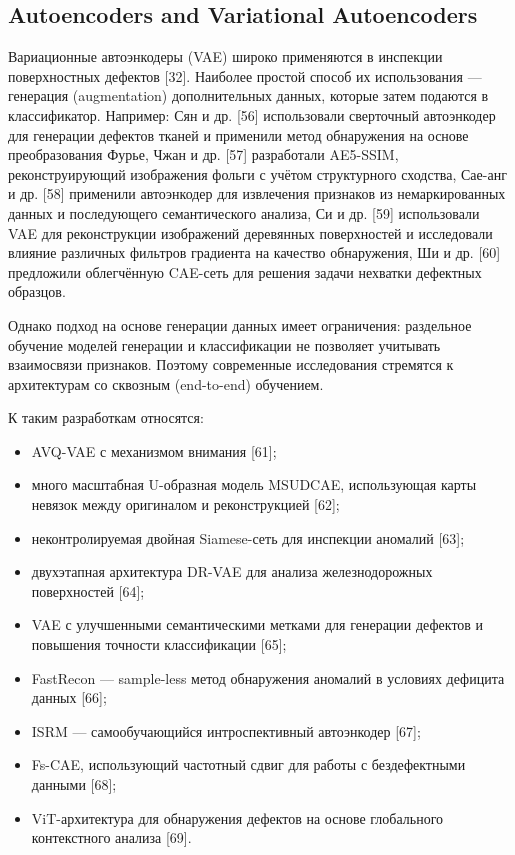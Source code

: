 \documentclass[14pt,a4paper]{article}
\begin{document}
\subsection{Autoencoders and Variational Autoencoders}

Вариационные автоэнкодеры (VAE) широко применяются в инспекции поверхностных дефектов [32]. Наиболее простой способ их использования — генерация (augmentation) дополнительных данных, которые затем подаются в классификатор. Например: Сян и др. [56] использовали сверточный автоэнкодер для генерации дефектов тканей и применили метод обнаружения на основе преобразования Фурье, Чжан и др. [57] разработали AE5-SSIM, реконструирующий изображения фольги с учётом структурного сходства, Сае-анг и др. [58] применили автоэнкодер для извлечения признаков из немаркированных данных и последующего семантического анализа, Си и др. [59] использовали VAE для реконструкции изображений деревянных поверхностей и исследовали влияние различных фильтров градиента на качество обнаружения, Ши и др. [60] предложили облегчённую CAE-сеть для решения задачи нехватки дефектных образцов.

Однако подход на основе генерации данных имеет ограничения: раздельное обучение моделей генерации и классификации не позволяет учитывать взаимосвязи признаков. Поэтому современные исследования стремятся к архитектурам со сквозным (end-to-end) обучением.

К таким разработкам относятся:
\begin{itemize}
	\item AVQ-VAE с механизмом внимания [61];
	\item много масштабная U-образная модель MSUDCAE, использующая карты невязок между оригиналом и реконструкцией [62];
	\item неконтролируемая двойная Siamese-сеть для инспекции аномалий [63];
	\item двухэтапная архитектура DR-VAE для анализа железнодорожных поверхностей [64];
	\item VAE с улучшенными семантическими метками для генерации дефектов и повышения точности классификации [65];
	\item FastRecon — sample-less метод обнаружения аномалий в условиях дефицита данных [66];
	\item ISRM — самообучающийся интроспективный автоэнкодер [67];
	\item Fs-CAE, использующий частотный сдвиг для работы с бездефектными данными [68];
	\item ViT-архитектура для обнаружения дефектов на основе глобального контекстного анализа [69].
\end{itemize}
\end{document}
